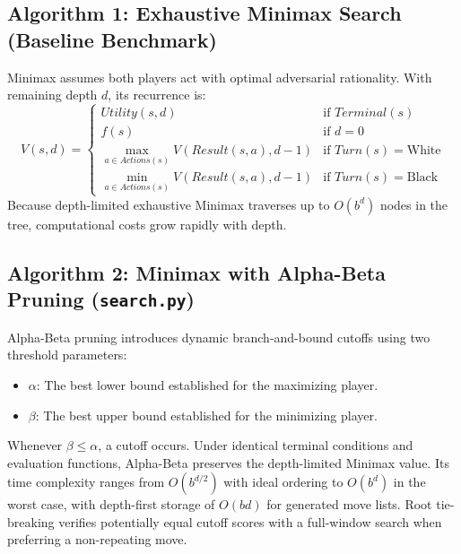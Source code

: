 \documentclass[11pt,a4paper]{article}
\begin{document}
\subsection{Algorithm 1: Exhaustive Minimax Search (Baseline Benchmark)}
Minimax assumes both players act with optimal adversarial rationality. With remaining depth $d$, its recurrence is:
\[V(s,d)=\begin{cases}
Utility(s,d) & \text{if } Terminal(s)\\
f(s)&\text{if }d=0\\
\max_{a\in Actions(s)} V(Result(s,a),d-1)&\text{if }Turn(s)=\text{White}\\
\min_{a\in Actions(s)} V(Result(s,a),d-1)&\text{if }Turn(s)=\text{Black}
\end{cases}\]
Because depth-limited exhaustive Minimax traverses up to $O(b^d)$ nodes in the tree, computational costs grow rapidly with depth.
\subsection{Algorithm 2: Minimax with Alpha-Beta Pruning (\texttt{search.py})}
Alpha-Beta pruning introduces dynamic branch-and-bound cutoffs using two threshold parameters:
\begin{itemize}[leftmargin=*]
    \item $\alpha$: The best lower bound established for the maximizing player.
    \item $\beta$: The best upper bound established for the minimizing player.
\end{itemize}
Whenever $\beta\le\alpha$, a cutoff occurs. Under identical terminal conditions and evaluation functions, Alpha-Beta preserves the depth-limited Minimax value. Its time complexity ranges from $O(b^{d/2})$ with ideal ordering to $O(b^d)$ in the worst case, with depth-first storage of $O(bd)$ for generated move lists. Root tie-breaking verifies potentially equal cutoff scores with a full-window search when preferring a non-repeating move.
\end{document}
